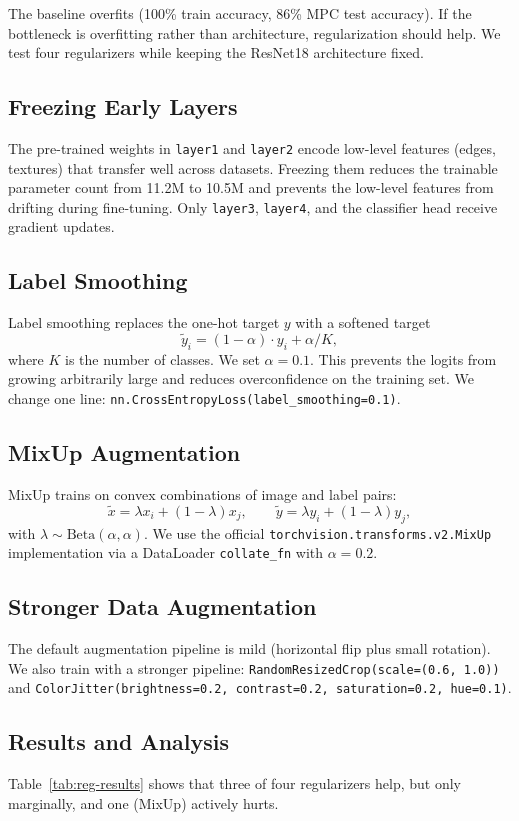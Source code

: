 The baseline overfits (100\% train accuracy, 86\% MPC test accuracy). If the bottleneck is overfitting rather than architecture, regularization should help. We test four regularizers while keeping the ResNet18 architecture fixed.

\subsection{Freezing Early Layers}
The pre-trained weights in \texttt{layer1} and \texttt{layer2} encode low-level features (edges, textures) that transfer well across datasets. Freezing them reduces the trainable parameter count from 11.2M to 10.5M and prevents the low-level features from drifting during fine-tuning. Only \texttt{layer3}, \texttt{layer4}, and the classifier head receive gradient updates.

\subsection{Label Smoothing}
Label smoothing \citep{szegedy2016rethinking} replaces the one-hot target $y$ with a softened target
\[
  \tilde{y}_i = (1-\alpha) \cdot y_i + \alpha / K,
\]
where $K$ is the number of classes. We set $\alpha = 0.1$. This prevents the logits from growing arbitrarily large and reduces overconfidence on the training set. We change one line: \texttt{nn.CrossEntropyLoss(label\_smoothing=0.1)}.

\subsection{MixUp Augmentation}
MixUp \citep{zhang2018mixup} trains on convex combinations of image and label pairs:
\[
  \tilde{x} = \lambda x_i + (1-\lambda) x_j, \qquad \tilde{y} = \lambda y_i + (1-\lambda) y_j,
\]
with $\lambda \sim \text{Beta}(\alpha, \alpha)$. We use the official \texttt{torchvision.transforms.v2.MixUp} implementation via a DataLoader \texttt{collate\_fn} with $\alpha = 0.2$.

\subsection{Stronger Data Augmentation}
The default augmentation pipeline is mild (horizontal flip plus small rotation). We also train with a stronger pipeline: \texttt{RandomResizedCrop(scale=(0.6, 1.0))} and \texttt{ColorJitter(brightness=0.2, contrast=0.2, saturation=0.2, hue=0.1)}.

\subsection{Results and Analysis}
Table~\ref{tab:reg-results} shows that three of four regularizers help, but only marginally, and one (MixUp) actively hurts.

